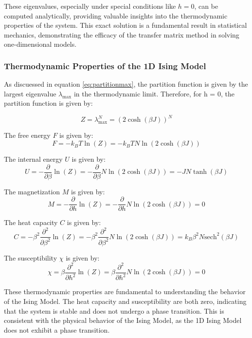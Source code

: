 These eigenvalues, especially under special conditions like \( h = 0 \), can be
computed analytically, providing valuable insights into the thermodynamic
properties of the system. This exact solution is a fundamental result in
statistical mechanics, demonstrating the efficacy of the transfer matrix method
in solving one-dimensional models.

\subsubsection{Thermodynamic Properties of the 1D Ising Model}

As discuessed in equation \ref{eq:partitionmax}, the partition function is given
by the largest eigenvalue \( \lambda_{\text{max}} \) in the thermodynamic limit.
Therefore, for h = 0, the partition function is given by:

\begin{equation}
Z = \lambda_{\text{max}}^N = (2 \cosh(\beta J))^N
\label{eq:partitionh0}
\end{equation}

The free energy \( F \) is given by:
\begin{equation}
F = -k_B T \ln(Z) = -k_B T N \ln(2 \cosh(\beta J))
\end{equation}

The internal energy \( U \) is given by:
\begin{equation}
U = - \frac{\partial}{\partial \beta} \ln(Z) = - \frac{\partial}{\partial \beta} N \ln(2 \cosh(\beta J)) = -JN \tanh(\beta J)
\end{equation}

The magnetization \( M \) is given by:
\begin{equation}
M = - \frac{\partial}{\partial h} \ln(Z) = - \frac{\partial}{\partial h} N \ln(2 \cosh(\beta J)) = 0
\end{equation}

The heat capacity \( C \) is given by:
\begin{equation}
C = - \beta^2 \frac{\partial^2}{\partial \beta^2} \ln(Z) = - \beta^2 \frac{\partial^2}{\partial \beta^2} N \ln(2 \cosh(\beta J)) = k_B \beta^2 N \text{sech}^2(\beta J)
\end{equation}

The susceptibility \( \chi \) is given by:
\begin{equation}
\chi = \beta \frac{\partial^2}{\partial h^2} \ln(Z) = \beta \frac{\partial^2}{\partial h^2} N \ln(2 \cosh(\beta J)) = 0
\end{equation}

These thermodynamic properties are fundamental to understanding the behavior of
the Ising Model. The heat capacity and susceptibility are both zero, indicating
that the system is stable and does not undergo a phase transition. This is
consistent with the physical behavior of the Ising Model, as the 1D Ising Model
does not exhibit a phase transition.

